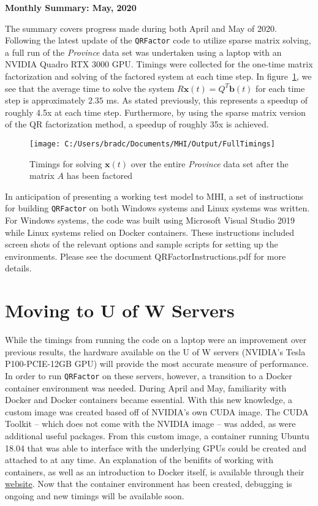 \documentclass[11pt,letterpaper]{article}
\newcommand{\qrf}{\texttt{QRFactor} }
\begin{document}
\begin{center}
    {\Large \bf Monthly Summary: May, 2020}
\end{center}

The summary covers progress made during both April and May of 2020. Following the latest
update of the \verb+QRFactor+ code to utilize sparse matrix solving, a full run of the \emph{Province}
data set was undertaken using a laptop with an NVIDIA Quadro RTX 3000 GPU. Timings were collected for
the one-time matrix factorization and solving of the factored system at each time step. 
In figure~\ref{f:timings}, we see that the average time to 
solve the system $R\mathbf{x}(t) = Q^T \mathbf{b}(t)$ for each time step is approximately $2.35$ ms.
As stated previously, this represents a speedup of roughly 4.5x at each time step. Furthermore, by using
the sparse matrix version of the QR factorization method, a speedup of roughly 35x is achieved.

\begin{figure}[ht]
    \centering
    \texttt{[image: C:/Users/bradc/Documents/MHI/Output/FullTimings]}
    \caption{Timings for solving $\mathbf{x}(t)$ over the entire \emph{Province} data set 
    after the matrix $A$ has been factored}
    \label{f:timings}
\end{figure}

In anticipation of presenting a working test model to MHI, a set of instructions for building
\qrf on both Windows systems and Linux systems was written. For Windows systems, the code was built using
Microsoft Visual Studio 2019 while Linux systems relied on Docker containers. These instructions included 
screen shots of the relevant options and sample scripts for setting up the environments. Please see the 
document QRFactorInstructions.pdf for more details.


\section*{Moving to U of W Servers}

While the timings from running the code on a laptop were an improvement over previous results, the hardware
available on the U of W servers (NVIDIA's Tesla P100-PCIE-12GB GPU) will provide the most accurate measure of 
performance. In order to run \qrf on these servers, however, a transition to a Docker container environment was
needed. During April and May, familiarity with Docker and Docker containers became essential. With this 
new knowledge, a custom image was created based off of NVIDIA's own CUDA image. The CUDA Toolkit -- which 
does not come with the NVIDIA image -- was added, as were additional useful packages. From this custom
image, a container running Ubuntu 18.04 that was able to interface with the underlying GPUs could be created
and attached to at any time. An explanation of the benifits of working with containers, as well as an introduction 
to Docker itself, is available through their \href{https://docker.com}{website}. Now that the container
environment has been created, debugging is ongoing and new timings will be available soon.
\end{document}
